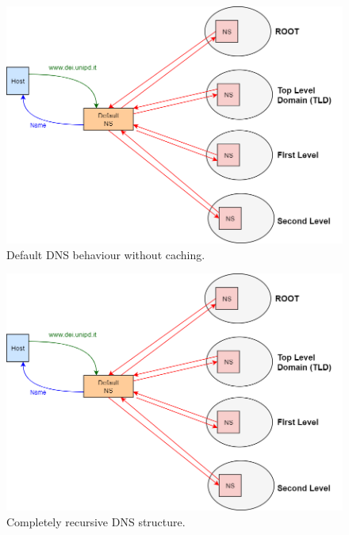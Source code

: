 \begin{figure}[h]
\centering
\includegraphics[scale=0.4]{Images/Resolution/default_DNS}
\caption{\footnotesize{Default DNS behaviour without caching.}}\label{default_DNS}
\end{figure}
\begin{figure}[h]
\centering
\includegraphics[scale=0.4]{Images/Resolution/default_DNS}
\caption{\footnotesize{Completely recursive DNS structure.}}\label{recursive_DNS}
\end{figure}
